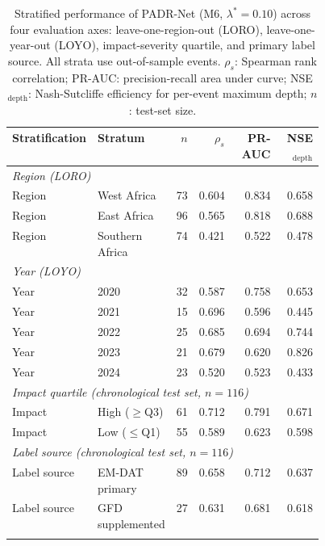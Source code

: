 \documentclass[pdflatex,sn-mathphys-ay]{sn-jnl}
\theoremstyle{thmstyleone}
\begin{document}
\begin{table}[p]
\centering
\small
\caption{Stratified performance of PADR-Net (M6, $\lambda^{*}=0.10$) across four evaluation axes:
  leave-one-region-out (LORO), leave-one-year-out (LOYO), impact-severity quartile, and primary
  label source.  All strata use out-of-sample events.
  $\rho_s$: Spearman rank correlation; PR-AUC: precision-recall area under curve;
  NSE$_\mathrm{depth}$: Nash-Sutcliffe efficiency for per-event maximum depth; $n$: test-set size.}
\label{tab:stratified_metrics}
\begin{tabular}{p{0.22\linewidth}p{0.23\linewidth}rrrr}
\toprule
Stratification & Stratum & $n$ & $\rho_s$ & PR-AUC & NSE$_\mathrm{depth}$ \\
\midrule
\multicolumn{6}{l}{\emph{Region (LORO)}} \\[2pt]
Region & West Africa & 73 & 0.604 & 0.834 & 0.658 \\
Region & East Africa & 96 & 0.565 & 0.818 & 0.688 \\
Region & Southern Africa & 74 & 0.421 & 0.522 & 0.478 \\
\midrule
\multicolumn{6}{l}{\emph{Year (LOYO)}} \\[2pt]
Year & 2020 & 32 & 0.587 & 0.758 & 0.653 \\
Year & 2021 & 15 & 0.696 & 0.596 & 0.445 \\
Year & 2022 & 25 & 0.685 & 0.694 & 0.744 \\
Year & 2023 & 21 & 0.679 & 0.620 & 0.826 \\
Year & 2024 & 23 & 0.520 & 0.523 & 0.433 \\
\midrule
\multicolumn{6}{l}{\emph{Impact quartile (chronological test set, $n=116$)}} \\[2pt]
Impact & High ($\geq$Q3) & 61 & 0.712 & 0.791 & 0.671 \\
Impact & Low ($\leq$Q1) & 55 & 0.589 & 0.623 & 0.598 \\
\midrule
\multicolumn{6}{l}{\emph{Label source (chronological test set, $n=116$)}} \\[2pt]
Label source & EM-DAT primary & 89 & 0.658 & 0.712 & 0.637 \\
Label source & GFD supplemented & 27 & 0.631 & 0.681 & 0.618 \\
\botrule
\end{tabular}
\end{table}
\end{document}
